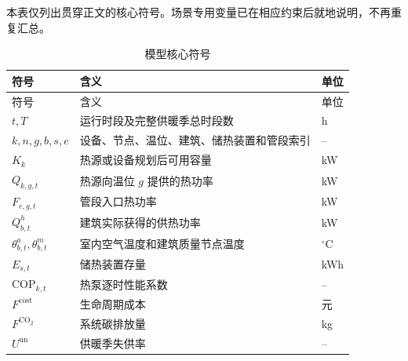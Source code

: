 \documentclass[12pt,a4paper]{article}
\begin{document}
本表仅列出贯穿正文的核心符号。场景专用变量已在相应约束后就地说明，不再重复汇总。

\begin{longtable}{p{}p{}p{}}
\caption{模型核心符号}\label{tab:symbols}\\
\toprule
符号 & 含义 & 单位\\
\midrule
\endfirsthead
\toprule
符号 & 含义 & 单位\\
\midrule
\endhead
$t,T$ & 运行时段及完整供暖季总时段数 & h\\
$k,n,g,b,s,e$ & 设备、节点、温位、建筑、储热装置和管段索引 & --\\
$K_k$ & 热源或设备规划后可用容量 & kW\\
$Q_{k,g,t}$ & 热源向温位 $g$ 提供的热功率 & kW\\
$F_{e,g,t}$ & 管段入口热功率 & kW\\
$Q_{b,t}^{h}$ & 建筑实际获得的供热功率 & kW\\
$\theta_{b,t}^{a},\theta_{b,t}^{m}$ & 室内空气温度和建筑质量节点温度 & $^{\circ}$C\\
$E_{s,t}$ & 储热装置存量 & kWh\\
$\mathrm{COP}_{k,t}$ & 热泵逐时性能系数 & --\\
$F^{\mathrm{cost}}$ & 生命周期成本 & 元\\
$F^{\mathrm{CO_2}}$ & 系统碳排放量 & kg\\
$U^{\mathrm{un}}$ & 供暖季失供率 & --\\
\bottomrule
\end{longtable}





\end{document}
